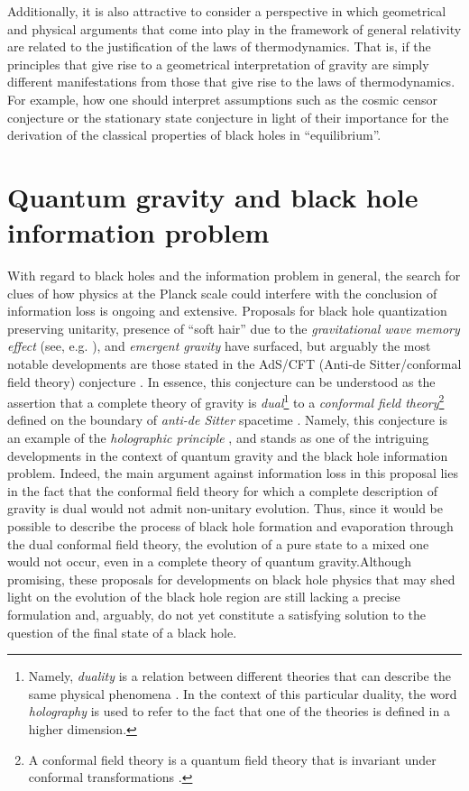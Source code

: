 \documentclass[
12pt,		%
openright,	%
twoside,  %
a4paper,			%
chapter=TITLE,		%
english,			%
french,				%
spanish,			%
brazil				%
]{USPSC-classe/USPSC}
\begin{document}
Additionally, it is also attractive to consider a perspective in which geometrical and physical arguments that come into play in the framework of general relativity are related to the justification of the laws of thermodynamics. That is, if the principles that give rise to a geometrical interpretation of gravity are simply different manifestations from those that give rise to the laws of thermodynamics. For example, how one should interpret assumptions such as the cosmic censor conjecture or the stationary state conjecture in light of their importance for the derivation of the classical properties of black holes in ``equilibrium''.

\section{Quantum gravity and black hole information problem}

With regard to black holes and the information problem in general, the search for clues of how physics at the Planck scale could interfere with the conclusion of information loss is ongoing and extensive. Proposals for black hole quantization \cite{Stephens1994} preserving unitarity, presence of ``soft hair'' due to the \textit{gravitational wave memory effect} (see, e.g. \cite{Hawking2016,Hawking2017, Favata2010}), and \textit{emergent gravity} \cite{Verlinde2011,Verlinde2017,Visser2019} have surfaced, but arguably the most notable developments are those stated in the AdS/CFT (Anti-de Sitter/conformal field theory) conjecture \cite{Maldacena1999,Hubeny2015}. In essence, this conjecture can be understood as the assertion that a complete theory of gravity is \textit{dual}\footnote{Namely, \textit{duality} is a relation between different theories that can describe the same physical phenomena \cite{Ammon2015}. In the context of this particular duality, the word \textit{holography} is used to refer to the fact that one of the theories is defined in a higher dimension.} to a \textit{conformal field theory}\footnote{A conformal field theory is a quantum field theory that is invariant under conformal transformations \cite{Francesco1996}.} defined on the boundary of \textit{anti-de Sitter} spacetime \cite{Hawking1973}. Namely, this conjecture is an example of the \textit{holographic principle} \cite{Bousso2002}, and stands as one of the intriguing developments in the context of quantum gravity and the black hole information problem. Indeed, the main argument against information loss in this proposal lies in the fact that the conformal field theory for which a complete description of gravity is dual would not admit non-unitary evolution. Thus, since it would be possible to describe the process of black hole formation and evaporation through the dual conformal field theory, the evolution of a pure state to a mixed one would not occur, even in a complete theory of quantum gravity.Although promising, these proposals for developments on black hole physics that may shed light on the evolution of the black hole region are still lacking a precise formulation and, arguably, do not yet constitute a satisfying solution to the question of the final state of a black hole.
\end{document}

